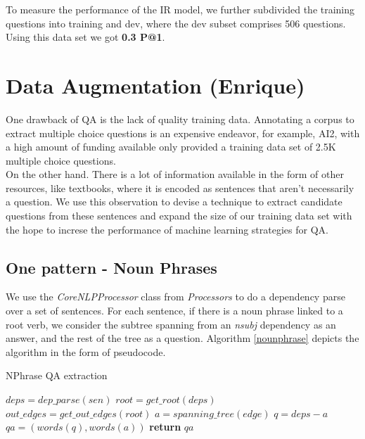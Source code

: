 To measure the performance of the IR model, we further subdivided the training questions into training and dev, where the dev subset comprises 506 questions. Using this data set we got \textbf{0.3 P@1}.

\section{Data Augmentation (Enrique)}

One drawback of QA is the lack of quality training data. Annotating a corpus to extract multiple choice questions is an expensive endeavor, for example, AI2, with a high amount of funding available only provided a training data set of 2.5K multiple choice questions.\\
On the other hand. There is a lot of information available in the form of other resources, like textbooks, where it is encoded as sentences that aren't necessarily a question. We use this observation to devise a technique to extract candidate questions from these sentences and expand the size of our training data set with the hope to increse the performance of machine learning strategies for QA.\\

\subsection{One pattern - Noun Phrases}

We use the \emph{CoreNLPProcessor}\cite{corenlp} class from \emph{Processors}\cite{processors} to do a dependency parse over a set of sentences. For each sentence, if there is a noun phrase linked to a root verb, we consider the subtree spanning from an \emph{nsubj} dependency as an answer, and the rest of the tree as a question. Algorithm \ref{nounphrase} depicts the algorithm in the form of pseudocode.\\

\begin{algorithm}
\caption{NPhrase QA extraction}\label{nounphrase}
\begin{algorithmic}[1]
   \State $deps = dep\_parse(sen)$
   \State $root = get\_root(deps)$
   \State $out\_edges = get\_out\_edges(root)$
		\State $a = spanning\_tree(edge)$
		\State $q = deps - a$
		\State $qa = (words(q), words(a))$
		\State \textbf{return} $qa$
	\EndIf
   \EndFor
   \EndProcedure
\end{algorithmic}
\end{algorithm}
   
